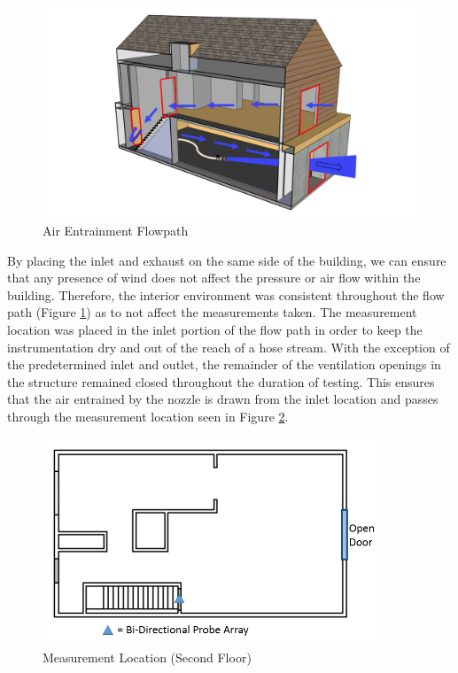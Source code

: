 \documentclass{article}
\begin{document}
\begin{figure}[!ht]
	\centering
	\includegraphics[width=6in]{Figures/Air_Entrainment/Airflow_Layout.png}
	\caption{Air Entrainment Flowpath}
	\label{fig:Air_Entrainment_Flowpath}
\end{figure}

By placing the inlet and exhaust on the same side of the building, we can ensure that any presence of wind does not affect the pressure or air flow within the building. Therefore, the interior environment was consistent throughout the flow path (Figure \ref{fig:Air_Entrainment_Flowpath}) as to not affect the measurements taken. The measurement location was placed in the inlet portion of the flow path in order to keep the instrumentation dry and out of the reach of a hose stream. With the exception of the predetermined inlet and outlet, the remainder of the ventilation openings in the structure remained closed throughout the duration of testing. This ensures that the air entrained by the nozzle is drawn from the inlet location and passes through the measurement location seen in Figure \ref{fig:Measurement_Location_Second_Floor}.

\clearpage

\begin{figure}[!ht]
	\centering
	\includegraphics[width=4in]{Figures/Air_Entrainment/Measurement_Locations_Secondfloor.png}
	\caption{Measurement Location (Second Floor)}
	\label{fig:Measurement_Location_Second_Floor}
\end{figure}
\end{document}
